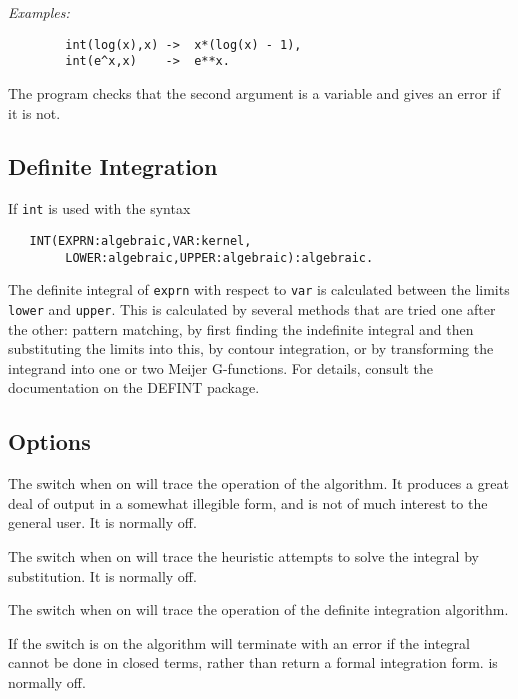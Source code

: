 \textit{Examples:}
\begin{verbatim}
        int(log(x),x) ->  x*(log(x) - 1),
        int(e^x,x)    ->  e**x.
\end{verbatim}
The program checks that the second argument is a variable and gives an
error if it is not.

\subsection{Definite Integration} 

If \texttt{int} is used with the syntax

\begin{verbatim}
   INT(EXPRN:algebraic,VAR:kernel,
        LOWER:algebraic,UPPER:algebraic):algebraic.
\end{verbatim}

The definite integral of \texttt{exprn} with respect to \texttt{var} is
calculated between the limits \texttt{lower} and \texttt{upper}.
This is calculated by several methods that are tried one after the other:
pattern matching, by first finding
the indefinite integral and then substituting the limits into this, by contour integration, or
by transforming the integrand into one or two Meijer G-functions.
For details, consult
the documentation on the DEFINT package.


\subsection{Options}
\hypertarget{switch:TRINT}{}
\hypertarget{switch:TRINTSUBST}{}
\hypertarget{switch:TRDEFINT}{}
\hypertarget{switch:FAILHARD}{}
\hypertarget{switch:NOLNR}{}
\hypertarget{switch:NOINTSUBST}{}

The switch  when on will trace the operation of the algorithm. It
produces a great deal of output in a somewhat illegible form, and is not
of much interest to the general user. It is normally off.

The switch  when on will trace the heuristic attempts to
solve the integral by substitution. It is normally off.

The switch  when on will trace the operation of the definite integration algorithm.

If the switch  is on the algorithm will terminate with an
error if the integral cannot be done in closed terms, rather than return a
formal integration form.  is normally off.


